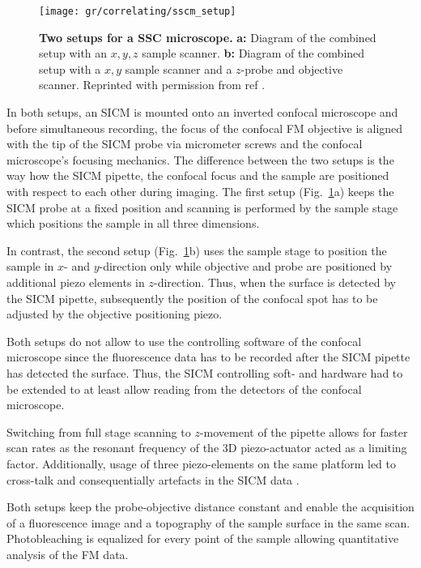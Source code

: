 \begin{figure}
  \texttt{[image: gr/correlating/sscm\_setup]}

  \caption{%
    \textbf{Two setups for a SSC microscope.}
    \textbf{a:} Diagram of the combined setup with an $x,y,z$ sample scanner.
    \textbf{b:} Diagram of the combined setup with a $x,y$ sample scanner and
    a $z$-probe and objective scanner. 
    Reprinted with permission from ref \cite{Shevchuk2013}.
  }
  \label{fig:sscm_setup}
\end{figure}

In both setups, an SICM is mounted onto an inverted confocal microscope and
before simultaneous recording, the focus of the confocal FM objective is
aligned with the tip of the SICM probe via micrometer screws and the confocal
microscope's focusing mechanics. The
difference between the two setups is the way how the SICM pipette, the
confocal focus and the sample are positioned with respect to each other during
imaging. The
first setup (Fig.~\ref{fig:sscm_setup}a) keeps the 
SICM probe at a fixed position and scanning is performed by the sample
stage which positions the sample in all three dimensions.

In contrast, the second setup (Fig.~\ref{fig:sscm_setup}b) uses the sample
stage to position the sample in $x$- and $y$-direction only while objective
and probe are positioned by additional piezo elements in $z$-direction. Thus,
when the surface is detected by the SICM pipette, subsequently the position of
the confocal spot has to be adjusted by the objective positioning piezo.

Both setups do not allow to use the controlling software of the confocal
microscope since the fluorescence data has to be recorded after the SICM
pipette has detected the surface. Thus, the SICM controlling soft- and
hardware had to be extended to at least allow reading from the detectors of
the confocal microscope. 

Switching from full stage scanning to $z$-movement of the pipette allows for
faster scan rates as the resonant frequency of the 3D piezo-actuator acted as
a limiting factor. Additionally, usage of three piezo-elements on the same
platform led to cross-talk and consequentially artefacts in the SICM data
\cite{Shevchuk2013}. 


Both setups keep the probe-objective distance constant and enable the acquisition of a fluorescence
image and a topography of the sample surface in the same scan. Photobleaching is equalized for every
point of the sample allowing quantitative analysis of the FM data.

